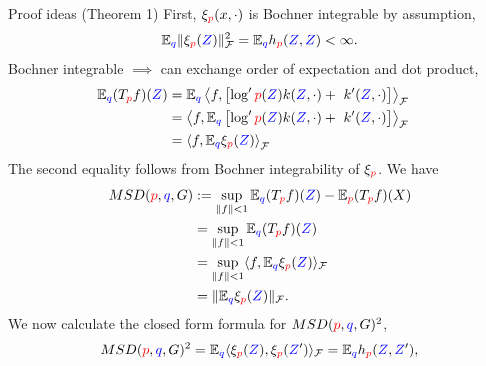\begin{frame}
\begin{columns}
\begin{column}{.33\linewidth}
\begin{block}{Proof ideas (Theorem 1)}
First, $\xi_{{ \color{red} p}}(x,\cdot)$ is Bochner integrable by assumption,
\[
\mathbb{E}_{{ \color{blue} q}}\|\xi_{{ \color{red} p}}({ \color{blue} Z})\|_{\mathcal{\mathcal{F}}}^{2}=\mathbb{E}_{{ \color{blue} q}}h_{{ \color{red} p}}({ \color{blue} Z},{ \color{blue} Z})<\infty.
\]
Bochner integrable $\implies$ can exchange order of expectation and dot product,
\begin{align*}
\mathbb{E}_{{ \color{blue} q}}(T_{{ \color{red} p}}f)({ \color{blue} Z})
&=
\mathbb{E}_{{ \color{blue} q}}  \left\langle f,\left[  \log' { \color{red} p}({ \color{blue} Z}) k({ \color{blue} Z},\cdot)+\ k'({ \color{blue} Z},\cdot) \right] \right \rangle _{\mathcal{\mathcal{F}}}\\
&=
\left\langle f,\mathbb{E}_{{ \color{blue} q}} \left[  \log' { \color{red} p}({ \color{blue} Z}) k({ \color{blue} Z},\cdot)+\ k'({ \color{blue} Z},\cdot) \right] \right \rangle _{\mathcal{\mathcal{F}}}\\
&=
\left\langle f,\mathbb{E}_{{ \color{blue} q}} \xi_{{ \color{red} p}}({ \color{blue} Z}) \right\rangle _{\mathcal{\mathcal{F}}}&
\end{align*}
The second equality follows from  Bochner integrability of $\xi_{{ \color{red} p}}$.
We have 
\begin{align*}
MSD({ \color{red} p},{ \color{blue} q},G) & :=\sup_{\Vert f\Vert<1}\mathbb{E}_{{ \color{blue} q}}(T_{{ \color{red} p}}f)({ \color{blue} Z})-\mathbb{E}_{{ \color{red} p}}(T_{{ \color{red} p}}f)(X)\\
 & =\sup_{\Vert f\Vert<1}\mathbb{E}_{{ \color{blue} q}}(T_{{ \color{red} p}}f)({ \color{blue} Z})\\
 & =\sup_{\Vert f\Vert<1}\langle f,\mathbb{E}_{{ \color{blue} q}}\xi_{{ \color{red} p}}({ \color{blue} Z})\rangle_{{\cal \mathcal{F}}}\\
 & =\|\mathbb{E}_{{ \color{blue} q}}\xi_{{ \color{red} p}}({ \color{blue} Z})\|_{\mathcal{\mathcal{F}}}.
\end{align*}
We now calculate the closed form formula for $MSD({ \color{red} p},{ \color{blue} q},G)^{2}$,
\begin{align*}
MSD({ \color{red} p},{ \color{blue} q},G)^{2}  =\mathbb{E}_{{ \color{blue} q}}\langle\xi_{{ \color{red} p}}({ \color{blue} Z}),\xi_{{ \color{red} p}}({ \color{blue} Z}')\rangle_{\mathcal{\mathcal{F}}}=\mathbb{E}_{{ \color{blue} q}}h_{{ \color{red} p}}({ \color{blue} Z},{ \color{blue} Z}'),
\end{align*}
\end{block}



\end{column}
\end{columns}
\end{frame}
